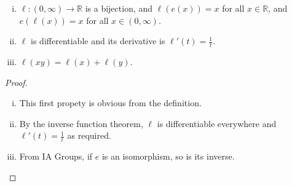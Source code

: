 \documentclass{article}
\begin{document}
\begin{theorem}
	\begin{enumerate}[(i)]
		\item $\ell \colon (0, \infty) \to \mathbb R$ is a bijection, and $\ell(e(x)) = x$ for all $x \in \mathbb R$, and $e(\ell(x)) = x$ for all $x \in (0, \infty)$.
		\item $\ell$ is differentiable and its derivative is $\ell'(t) = \frac{1}{t}$.
		\item $\ell(xy) = \ell(x) + \ell(y)$.
	\end{enumerate}
\end{theorem}
\begin{proof}
	\begin{enumerate}[(i)]
		\item This first propety is obvious from the definition.
		\item By the inverse function theorem, $\ell$ is differentiable everywhere and $\ell'(t) = \frac{1}{t}$ as required.
		\item From IA Groups, if $e$ is an isomorphism, so is its inverse.
	\end{enumerate}
\end{proof}
\end{document}
